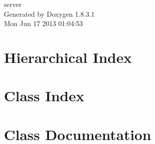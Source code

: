 \documentclass{book}
\begin{document}
\hypersetup{pageanchor=false,citecolor=blue}
\begin{titlepage}
\vspace*{7cm}
\begin{center}
{\Large server }\\
\vspace*{1cm}
{\large Generated by Doxygen 1.8.3.1}\\
\vspace*{0.5cm}
{\small Mon Jun 17 2013 01:04:53}\\
\end{center}
\end{titlepage}
\clearemptydoublepage
{}
\tableofcontents
\clearemptydoublepage
{}
\hypersetup{pageanchor=true,citecolor=blue}
\chapter{Hierarchical Index}

\chapter{Class Index}

\chapter{Class Documentation}




























\printindex
\end{document}
